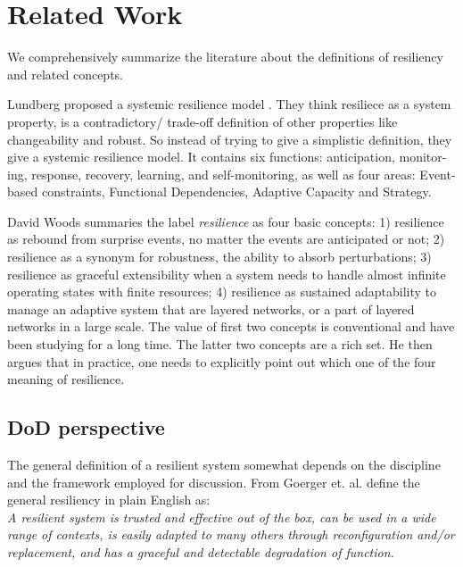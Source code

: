 \documentclass[11pt]{article}
\begin{document}
\section{Related Work}
We comprehensively summarize the literature about the definitions of resiliency and related concepts.

Lundberg proposed a systemic resilience model \cite{Lundberg2015}. They think resiliece as a system property, is a contradictory/ trade-off definition of other properties like changeability and robust. So instead of trying to give a simplistic definition, they give a systemic resilience model. It contains six functions: anticipation, monitor- ing, response, recovery, learning, and self-monitoring, as well as four areas: Event-based constraints, Functional Dependencies, Adaptive Capacity and Strategy.

David Woods \cite{Woods2015} summaries the label \emph{resilience} as four basic concepts: 1) resilience as rebound from surprise events, no matter the events are anticipated or not; 2) resilience as a synonym for robustness, the ability to absorb perturbations; 3) resilience as graceful extensibility when a system needs to handle almost infinite operating states with finite resources; 4) resilience as sustained adaptability to manage an adaptive system that are layered networks, or a part of layered networks in a large scale. The value of first two concepts is conventional and have been studying for a long time. The latter two concepts are a rich set. He then argues that in practice, one needs to explicitly point out which one of the four meaning of resilience. 

\subsection{DoD perspective}
The general definition of a resilient system somewhat depends on the discipline and the framework employed for discussion. From Goerger et. al. \cite{Goerger2014} define the general resiliency in plain English as:\\

\emph{
A resilient system is trusted and effective out of the box, can be used in a wide range of contexts, is easily adapted to many others through reconfiguration and/or replacement, and has a graceful and detectable degradation of function.
}\\
\end{document}
